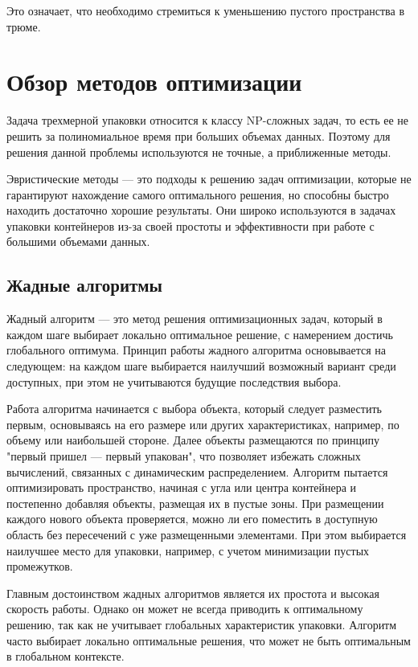 Это означает, что необходимо стремиться к уменьшению пустого пространства в трюме.


\section{Обзор методов оптимизации}
Задача трехмерной упаковки относится к классу NP-сложных задач, то есть ее не решить за полиномиальное время при больших объемах данных. Поэтому для решения данной проблемы используются не точные, а приближенные методы.

Эвристические методы — это подходы к решению задач оптимизации, которые не гарантируют нахождение самого оптимального решения, но способны быстро находить достаточно хорошие результаты. Они широко используются в задачах упаковки контейнеров из-за своей простоты и эффективности при работе с большими объемами данных.


\subsection{Жадные алгоритмы}
Жадный алгоритм — это метод решения оптимизационных задач, который в каждом шаге выбирает локально оптимальное решение, с намерением достичь глобального оптимума. Принцип работы жадного алгоритма основывается на следующем: на каждом шаге выбирается наилучший возможный вариант среди доступных, при этом не учитываются будущие последствия выбора\cite{greedy}.

Работа алгоритма начинается с выбора объекта, который следует разместить первым, основываясь на его размере или других характеристиках, например, по объему или наибольшей стороне. Далее объекты размещаются по принципу "первый пришел — первый упакован", что позволяет избежать сложных вычислений, связанных с динамическим распределением. Алгоритм пытается оптимизировать пространство, начиная с угла или центра контейнера и постепенно добавляя объекты, размещая их в пустые зоны. При размещении каждого нового объекта проверяется, можно ли его поместить в доступную область без пересечений с уже размещенными элементами. При этом выбирается наилучшее место для упаковки, например, с учетом минимизации пустых промежутков.

Главным достоинством жадных алгоритмов является их простота и высокая скорость работы. Однако он может не всегда приводить к оптимальному решению, так как не учитывает глобальных характеристик упаковки. Алгоритм часто выбирает локально оптимальные решения, что может не быть оптимальным в глобальном контексте. 

